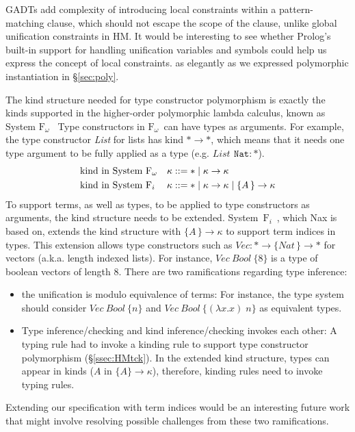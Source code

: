 \documentclass[runningheads,a4paper]{llncs}
\newcommand{\Fw}{\ensuremath{\mathrm{F}_\omega}}
\newcommand{\Fi}{\ensuremath{\mathrm{F}_i}}
\begin{document}
GADTs add complexity of introducing local constraints
within a pattern-matching clause, which should not escape
the scope of the clause, unlike global unification constraints in HM.
It would be interesting to see whether Prolog's built-in support for
handling unification variables and symbols could help us express
the concept of local constraints.
as elegantly as we expressed
polymorphic instantiation in \S\ref{sec:poly}.

The kind structure needed for type constructor polymorphism is exactly
the kinds supported in the higher-order polymorphic lambda calculus,
known as System \Fw\ %
Type constructors in \Fw\ can have types as arguments.
For example, the type constructor \textit{List}
for lists has kind $* \to *$, which means that it needs one type argument
to be fully applied as a type (e.g. $\textit{List}\,~\texttt{Nat} : *$).
\begin{align*}
  &\text{kind in System \Fw}  &&\kappa ::= * \mid \kappa \to \kappa \\
  &\text{kind in System \Fi}  &&\kappa ::= * \mid \kappa \to \kappa
                                             \mid \{A\,\}\to \kappa
\end{align*}
To support terms, as well as types, to be applied to type constructors
as arguments, the kind structure needs to be extended.
System~\Fi\ \cite{AhnSheFioPit13}, which Nax is based on, extends
the kind structure with $\{A\,\}\to \kappa$ to support term indices in types.
This extension allows type constructors 
such as $\textit{Vec} : * \to \{\textit{Nat}\,\} \to *$ for vectors
(a.k.a. length indexed lists). For instance,
$\textit{Vec}~\textit{Bool}~\{8\}$ is a type of boolean vectors of length 8.
There are two ramifications regarding type inference:
\begin{itemize}\vspace*{-.75ex}
\item the unification is modulo equivalence of terms: For instance,
  the type system should consider $\textit{Vec}~\textit{Bool}~\{n\}$ and
  $\textit{Vec}~\textit{Bool}~\{(\lambda x.x)\;n\}$ as equivalent types.
  \vspace*{.5ex}
\item Type inference/checking and kind inference/checking invokes each other:
  A typing rule had to invoke a kinding rule to support
  type constructor polymorphism  (\S\ref{ssec:HMtck}).
  In the extended kind structure, types can appear in kinds
  ($A$ in $\{\!A\}\to\kappa$), therefore, kinding rules
  need to invoke typing rules.
\end{itemize}
Extending our specification with term indices would be
an interesting future work that might involve resolving possible challenges
from these two ramifications.
\end{document}
